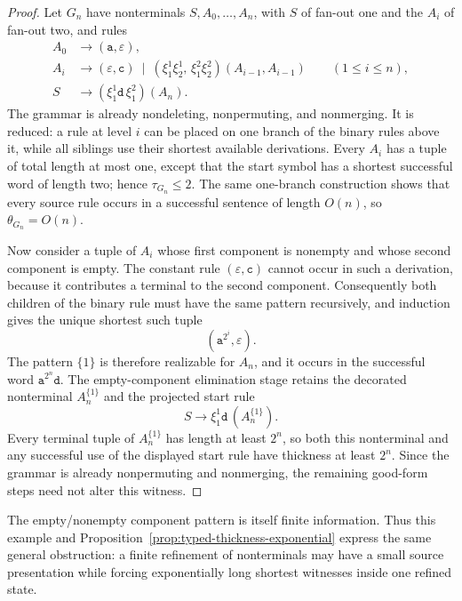 \documentclass[11pt]{article}
\numberwithin{equation}{section}
\theoremstyle{plain}
\theoremstyle{definition}
\theoremstyle{remark}
\newcommand{\eps}{\varepsilon}
\begin{document}
\begin{proof}
Let $G_n$ have nonterminals $S,A_0,\ldots,A_n$, with $S$ of fan-out one and
the $A_i$ of fan-out two, and rules
\[
\begin{aligned}
 A_0&\to(\mathtt a,\eps),\\
 A_i&\to(\eps,\mathtt c)
      \ \mid\
      (\xi_1^1\xi_2^1,\,\xi_1^2\xi_2^2)(A_{i-1},A_{i-1})
      \qquad(1\le i\le n),\\
 S&\to(\xi_1^1\mathtt d\,\xi_1^2)(A_n).
\end{aligned}
\]
The grammar is already nondeleting, nonpermuting, and nonmerging.  It is
reduced: a rule at level $i$ can be placed on one branch of the binary rules
above it, while all siblings use their shortest available derivations.  Every
$A_i$ has a tuple of total length at most one, except that the start symbol has
a shortest successful word of length two; hence $\tau_{G_n}\le2$.  The same
one-branch construction shows that every source rule occurs in a successful
sentence of length $O(n)$, so $\theta_{G_n}=O(n)$.

Now consider a tuple of $A_i$ whose first component is nonempty and whose
second component is empty.  The constant rule $(\eps,\mathtt c)$ cannot occur
in such a derivation, because it contributes a terminal to the second
component.  Consequently both children of the binary rule must have the same
pattern recursively, and induction gives the unique shortest such tuple
\[
   (\mathtt a^{2^i},\eps).
\]
The pattern $\{1\}$ is therefore realizable for $A_n$, and it occurs in the
successful word $\mathtt a^{2^n}\mathtt d$.  The empty-component elimination
stage retains the decorated nonterminal $A_n^{\{1\}}$ and the projected start
rule
\[
   S\to \xi_1^1\mathtt d\,(A_n^{\{1\}}).
\]
Every terminal tuple of $A_n^{\{1\}}$ has length at least $2^n$, so both this
nonterminal and any successful use of the displayed start rule have thickness
at least $2^n$.  Since the grammar is already nonpermuting and nonmerging, the
remaining good-form steps need not alter this witness.
\end{proof}

The empty/nonempty component pattern is itself finite information.  Thus this
example and Proposition~\ref{prop:typed-thickness-exponential} express the
same general obstruction: a finite refinement of nonterminals may have a
small source presentation while forcing exponentially long shortest witnesses
inside one refined state.
\end{document}

